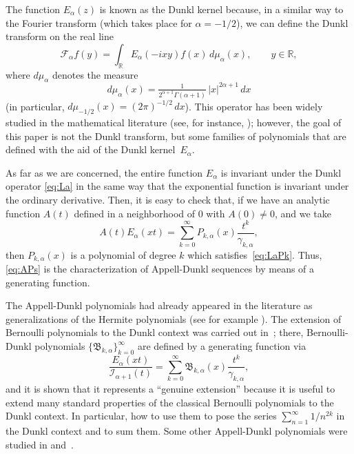 \documentclass[11pt]{article}
\theoremstyle{plain}
\theoremstyle{remark}
\numberwithin{equation}{section} %
\newcommand{\Ea}{E_{\alpha}}
\newcommand{\La}{\Lambda_{\alpha}}
\newcommand{\Fa}{\mathcal{F}_{\alpha}} %
\newcommand{\mua}{\mu_{\alpha}}
\newcommand{\I}{\mathcal{I}}
\newcommand{\B}{\mathfrak{B}}
\newcommand{\RR}{\mathbb{R}}
\newcommand{\cc}{\gamma}
\begin{document}
The function $\Ea(z)$ is known as the Dunkl kernel because, in a similar way to the Fourier transform (which takes place for $\alpha = -1/2$), 
we can define the Dunkl transform on the real line
\begin{equation}
\label{eq:trDu}
  \Fa f(y)
  = \int_{\RR} \Ea(-ixy)f(x)\,d\mua(x),
  \qquad y \in \RR,
\end{equation}
where $d\mua$ denotes the measure
\[
  d\mua(x) = \tfrac{1}{2^{\alpha+1}\Gamma(\alpha+1)}\, |x|^{2\alpha+1}\,dx
\]
(in particular, $d\mu_{-1/2}(x) = (2\pi)^{-1/2}\,dx$).
This operator has been widely studied in the mathematical literature
(see, for instance, \cite{Jeu, Ros, Rosler-LN, Tr, AdJ, NS, CPRV, DW, CRV, MO}); 
however, the goal of this paper is not the Dunkl transform, but some families of
polynomials that are defined with the aid of the Dunkl kernel~$\Ea$.

As far as we are concerned, the entire function $\Ea$ 
is invariant under the Dunkl operator \eqref{eq:La}
in the same way that the exponential function is invariant under the ordinary derivative.
Then, it is easy to check that, if we have an analytic function $A(t)$
defined in a neighborhood of $0$ with $A(0) \ne 0$, and we take
\begin{equation}
\label{eq:APs}
  A(t)\Ea(xt) = \sum_{k=0}^\infty P_{k,\alpha}(x) \frac{t^k}{\cc_{k,\alpha}},
\end{equation}
then $P_{k,\alpha}(x)$ is a polynomial of degree $k$ which satisfies~\eqref{eq:LaPk}.
Thus, \eqref{eq:APs} is the characterization of Appell-Dunkl sequences
by means of a generating function.

The Appell-Dunkl polynomials had already appeared in the literature as 
generalizations of the Hermite polynomials (see for example \cite{AlS, Ros}).
The extension of Bernoulli polynomials to the Dunkl context was carried out in~\cite{CDPV};
there, Bernoulli-Dunkl polynomials $\{\B_{k,\alpha}\}_{k=0}^{\infty}$
are defined by a generating function via
\begin{equation}
\label{eq:defbd}
  \frac{\Ea(xt)}{\I_{\alpha+1}(t)}
  = \sum_{k=0}^\infty \B_{k,\alpha}(x) \frac{t^k}{\cc_{k,\alpha}},
\end{equation}
and it is shown that it represents a ``genuine extension'' because it is useful
to extend many standard properties of the classical Bernoulli polynomials
to the Dunkl context. In particular, how to use them 
to pose the series $\sum_{n=1}^{\infty} 1/n^{2k}$ in the Dunkl context
and to sum them. Some other Appell-Dunkl polynomials were studied
in \cite{DPV} and~\cite{CMV}.
\end{document}
